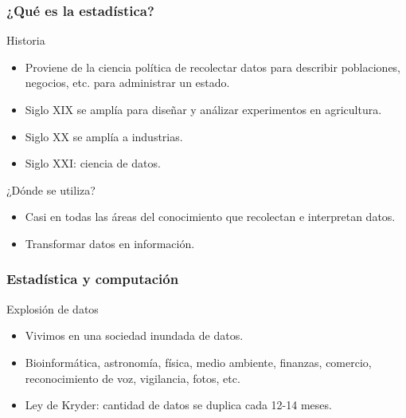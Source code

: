 \documentclass[table]{beamer}
\begin{document}
\begin{frame}
    \frametitle{¿Qué es la estadística?}
    \begin{block}{Historia}
        \begin{itemize}
            \item Proviene de la ciencia política de recolectar datos para describir poblaciones, negocios, etc. para administrar un estado.
            \item Siglo XIX se amplía para diseñar y análizar experimentos en agricultura.
            \item Siglo XX se amplía a industrias.
            \item Siglo XXI: ciencia de datos.
        \end{itemize}
    \end{block}
    \begin{block}{¿Dónde se utiliza?}
        \begin{itemize}
            \item Casi en todas las áreas del conocimiento que recolectan e interpretan datos.
            \item Transformar datos en información.
        \end{itemize}
    \end{block}
\end{frame}

\begin{frame}
    \frametitle{Estadística y computación}
    \begin{block}{Explosión de datos}
        \begin{itemize}
            \item Vivimos en una sociedad inundada de datos.
            \item Bioinformática, astronomía, física, medio ambiente, finanzas, comercio, reconocimiento de voz, vigilancia, fotos, etc.
            \item Ley de Kryder: cantidad de datos se duplica cada 12-14 meses.
        \end{itemize}
    \end{block}

    
    
    
\end{frame}
\end{document}
